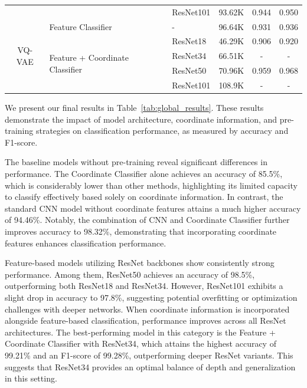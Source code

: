 \documentclass{article}
\begin{document}
\begin{table}[!htp]
\begin{tabular}{cllccc}
                                      &                                                  & ResNet101         & 93.62K            & 0.944             & 0.950             \\\cmidrule{1-6}
    \multirow{5}{*}{VQ-VAE}           & Feature Classifier                               & -                 & 96.64K            & 0.931             & 0.936             \\ \cmidrule{2-6}
                                      & \multirow{4}{*}{Feature + Coordinate Classifier} & ResNet18          & 46.29K            & 0.906             & 0.920             \\
                                      &                                                  & ResNet34          & 66.51K            & -                 & -                 \\
                                      &                                                  & ResNet50          & 70.96K            & 0.959             & 0.968             \\
                                      &                                                  & ResNet101         & 108.9K            & -                 & -                 \\\midrule
    \bottomrule
  \end{tabular}
\end{table}

We present our final results in Table~\ref{tab:global_results}. These results
demonstrate the impact of model architecture, coordinate information, and
pre-training strategies on classification performance, as measured by accuracy
and F1-score.

The baseline models without pre-training reveal significant differences in
performance. The Coordinate Classifier alone achieves an accuracy of 85.5\%,
which is considerably lower than other methods, highlighting its limited
capacity to classify effectively based solely on coordinate information. In
contrast, the standard CNN model without coordinate features attains a much
higher accuracy of 94.46\%. Notably, the combination of CNN and Coordinate
Classifier further improves accuracy to 98.32\%, demonstrating that
incorporating coordinate features enhances classification performance.

Feature-based models utilizing ResNet backbones show consistently strong
performance. Among them, ResNet50 achieves an accuracy of 98.5\%, outperforming
both ResNet18 and ResNet34. However, ResNet101 exhibits a slight drop in
accuracy to 97.8\%, suggesting potential overfitting or optimization challenges
with deeper networks. When coordinate information is incorporated alongside
feature-based classification, performance improves across all ResNet
architectures. The best-performing model in this category is the Feature +
Coordinate Classifier with ResNet34, which attains the highest accuracy of
99.21\% and an F1-score of 99.28\%, outperforming deeper ResNet variants. This
suggests that ResNet34 provides an optimal balance of depth and generalization
in this setting.
\end{document}
